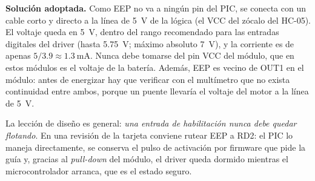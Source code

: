 \noindent\textbf{Solución adoptada.} Como EEP no va a ningún pin del PIC, se
conecta con un cable corto y directo a la línea de \SI{5}{\volt} de la lógica
(el VCC del zócalo del HC-05). El voltaje queda en \SI{5}{\volt}, dentro del
rango recomendado para las entradas digitales del driver (hasta
\SI{5.75}{\volt}; máximo absoluto \SI{7}{\volt}), y la corriente es de apenas
$5/3.9 \approx \SI{1.3}{\milli\ampere}$. Nunca debe tomarse del pin VCC del
módulo, que en estos módulos es el voltaje de la batería. Además, EEP es
vecino de OUT1 en el módulo: antes de energizar hay que verificar con el
multímetro que no exista continuidad entre ambos, porque un puente llevaría el
voltaje del motor a la línea de \SI{5}{\volt}.

La lección de diseño es general: \emph{una entrada de habilitación nunca debe
quedar flotando}. En una revisión de la tarjeta conviene rutear EEP a RD2: el PIC
lo maneja directamente, se conserva el pulso de activación por firmware que pide
la guía y, gracias al \emph{pull-down} del módulo, el driver queda dormido
mientras el microcontrolador arranca, que es el estado seguro.
